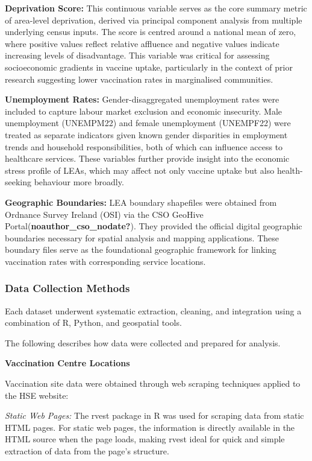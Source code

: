 \documentclass{article}
\begin{document}
\textbf{Deprivation Score:} This continuous variable serves as the core
summary metric of area-level deprivation, derived via principal
component analysis from multiple underlying census inputs. The score is
centred around a national mean of zero, where positive values reflect
relative affluence and negative values indicate increasing levels of
disadvantage. This variable was critical for assessing socioeconomic
gradients in vaccine uptake, particularly in the context of prior
research suggesting lower vaccination rates in marginalised communities.

\textbf{Unemployment Rates:} Gender-disaggregated unemployment rates
were included to capture labour market exclusion and economic
insecurity. Male unemployment (UNEMPM22) and female unemployment
(UNEMPF22) were treated as separate indicators given known gender
disparities in employment trends and household responsibilities, both of
which can influence access to healthcare services. These variables
further provide insight into the economic stress profile of LEAs, which
may affect not only vaccine uptake but also health-seeking behaviour
more broadly.

\textbf{Geographic Boundaries:} LEA boundary shapefiles were obtained
from Ordnance Survey Ireland (OSI) via the CSO GeoHive
Portal(\textbf{noauthor\_cso\_nodate?}). They provided the official
digital geographic boundaries necessary for spatial analysis and mapping
applications. These boundary files serve as the foundational geographic
framework for linking vaccination rates with corresponding service
locations.

\subsubsection{Data Collection Methods}\label{data-collection-methods}

Each dataset underwent systematic extraction, cleaning, and integration
using a combination of R, Python, and geospatial tools.

The following describes how data were collected and prepared for
analysis.

\textbf{Vaccination Centre Locations}

Vaccination site data were obtained through web scraping techniques
applied to the HSE website:

\emph{Static Web Pages:} The rvest package in R was used for scraping
data from static HTML pages. For static web pages, the information is
directly available in the HTML source when the page loads, making rvest
ideal for quick and simple extraction of data from the page's structure.
\end{document}
